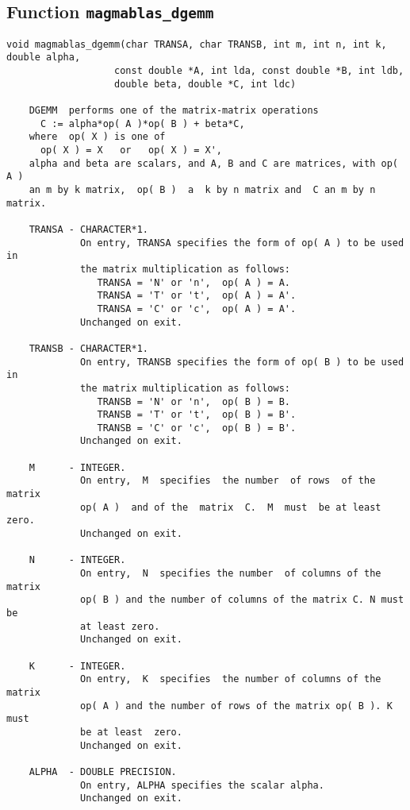 \documentclass[10pt]{book}
\begin{document}
\newpage
\subsection{Function {\tt {\bf magmablas_dgemm}}}
\begin{verbatim}
void magmablas_dgemm(char TRANSA, char TRANSB, int m, int n, int k, double alpha,
                   const double *A, int lda, const double *B, int ldb, 
                   double beta, double *C, int ldc)
 
    DGEMM  performs one of the matrix-matrix operations
      C := alpha*op( A )*op( B ) + beta*C,
    where  op( X ) is one of
      op( X ) = X   or   op( X ) = X',
    alpha and beta are scalars, and A, B and C are matrices, with op( A )
    an m by k matrix,  op( B )  a  k by n matrix and  C an m by n matrix.
   
    TRANSA - CHARACTER*1.
             On entry, TRANSA specifies the form of op( A ) to be used in
             the matrix multiplication as follows:
                TRANSA = 'N' or 'n',  op( A ) = A.
                TRANSA = 'T' or 't',  op( A ) = A'.
                TRANSA = 'C' or 'c',  op( A ) = A'.
             Unchanged on exit.
 
    TRANSB - CHARACTER*1.
             On entry, TRANSB specifies the form of op( B ) to be used in
             the matrix multiplication as follows:
                TRANSB = 'N' or 'n',  op( B ) = B.
                TRANSB = 'T' or 't',  op( B ) = B'.
                TRANSB = 'C' or 'c',  op( B ) = B'.
             Unchanged on exit.
 
    M      - INTEGER.
             On entry,  M  specifies  the number  of rows  of the  matrix
             op( A )  and of the  matrix  C.  M  must  be at least  zero.
             Unchanged on exit.
 
    N      - INTEGER.
             On entry,  N  specifies the number  of columns of the matrix
             op( B ) and the number of columns of the matrix C. N must be
             at least zero.
             Unchanged on exit.
 
    K      - INTEGER.
             On entry,  K  specifies  the number of columns of the matrix
             op( A ) and the number of rows of the matrix op( B ). K must
             be at least  zero.
             Unchanged on exit.
 
    ALPHA  - DOUBLE PRECISION.
             On entry, ALPHA specifies the scalar alpha.
             Unchanged on exit.
 

\end{verbatim}
\end{document}
